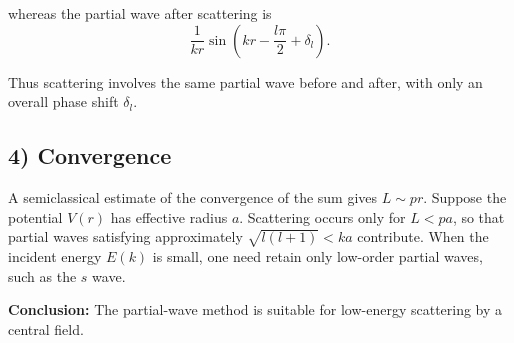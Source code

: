 whereas the partial wave after scattering is
\begin{equation}
\frac1{kr}\sin\left(kr-\frac{l\pi}2+\delta_l\right).
\end{equation}
\begin{center}
\end{center}
Thus scattering involves the same partial wave before and after, with only an overall phase shift $\delta_l$.

\subsection*{4) Convergence}
A semiclassical estimate of the convergence of the sum gives $L\sim pr$. Suppose the potential $V(r)$ has effective radius $a$. Scattering occurs only for $L<pa$, so that partial waves satisfying approximately $\sqrt{l(l+1)}<ka$ contribute. When the incident energy $E(k)$ is small, one need retain only low-order partial waves, such as the $s$ wave.

\textbf{Conclusion:} The partial-wave method is suitable for low-energy scattering by a central field.


